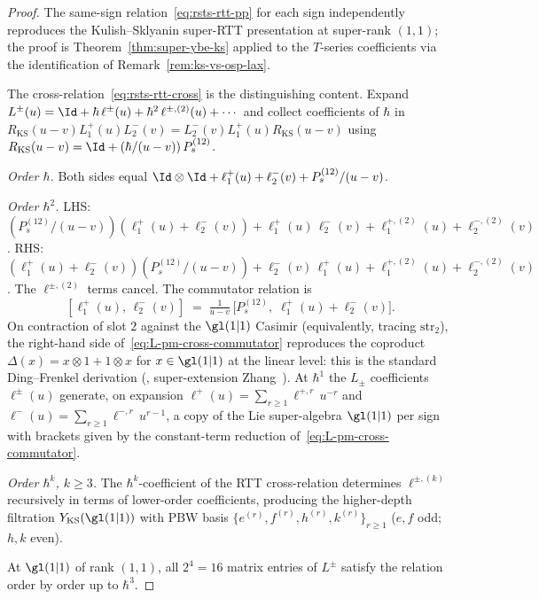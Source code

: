 \begin{proof}
The same-sign relation~\eqref{eq:rsts-rtt-pp} for each sign
independently reproduces the Kulish--Sklyanin super-RTT presentation
at super-rank $(1,1)$;
the proof is Theorem~\ref{thm:super-ybe-ks} applied to the
$T$-series coefficients via the identification of
Remark~\ref{rem:ks-vs-osp-lax}.

The cross-relation~\eqref{eq:rsts-rtt-cross} is the distinguishing
content. Expand $L^\pm(u) = \Id + \hbar\, \ell^\pm(u) +
\hbar^2\, \ell^{\pm, (2)}(u) + \cdots$ and collect coefficients of
$\hbar$ in
$R_{\mathrm{KS}}(u-v) L_1^+(u) L_2^-(v) =
 L_2^-(v) L_1^+(u) R_{\mathrm{KS}}(u-v)$ using
$R_{\mathrm{KS}}(u-v) = \Id + (\hbar/(u-v))\, P_s^{(12)}$.

\emph{Order $\hbar$.} Both sides equal
$\Id \otimes \Id + \ell^+_1(u) + \ell^-_2(v) + P_s^{(12)}/(u-v)$.

\emph{Order $\hbar^2$.} LHS:
$(P_s^{(12)}/(u-v))(\ell^+_1(u) + \ell^-_2(v)) +
 \ell^+_1(u)\, \ell^-_2(v) + \ell^{+, (2)}_1(u) + \ell^{-, (2)}_2(v)$.
RHS: $(\ell^+_1(u) + \ell^-_2(v))(P_s^{(12)}/(u-v)) +
 \ell^-_2(v)\, \ell^+_1(u) + \ell^{+, (2)}_1(u) + \ell^{-, (2)}_2(v)$.
The $\ell^{\pm, (2)}$ terms cancel. The commutator relation is
\begin{equation}\label{eq:L-pm-cross-commutator}
 [\ell^+_1(u),\, \ell^-_2(v)]
 \;=\;
 \tfrac{1}{u - v}\,\bigl[P_s^{(12)},\; \ell^+_1(u) + \ell^-_2(v)\bigr].
\end{equation}
On contraction of slot $2$ against the $\gl(1|1)$ Casimir
(equivalently, tracing $\mathrm{str}_2$), the right-hand side
of~\eqref{eq:L-pm-cross-commutator} reproduces the coproduct
$\Delta(x) = x \otimes 1 + 1 \otimes x$ for $x \in \gl(1|1)$ at the
linear level: this is the standard Ding--Frenkel derivation
(\cite{DingFrenkel1993}, super-extension Zhang~\cite{Zhang1995}).
At $\hbar^1$ the $L_\pm$ coefficients $\ell^\pm(u)$ generate, on
expansion $\ell^+(u) = \sum_{r \geq 1} \ell^{+, r}\, u^{-r}$ and
$\ell^-(u) = \sum_{r \geq 1} \ell^{-, r}\, u^{r-1}$, a copy of the
Lie super-algebra $\gl(1|1)$ per sign with brackets given by
the constant-term reduction of~\eqref{eq:L-pm-cross-commutator}.

\emph{Order $\hbar^k$, $k \geq 3$.} The $\hbar^k$-coefficient of the
RTT cross-relation determines $\ell^{\pm, (k)}$ recursively in terms
of lower-order coefficients, producing the higher-depth filtration
$Y_{\mathrm{KS}}(\gl(1|1))$ with PBW basis
$\{e^{(r)}, f^{(r)}, h^{(r)}, k^{(r)}\}_{r \geq 1}$
($e, f$ odd; $h, k$ even).

At $\gl(1|1)$ of rank $(1,1)$, all $2^4=16$ matrix entries of $L^\pm$
satisfy the relation order by order up to $\hbar^3$.
\end{proof}


